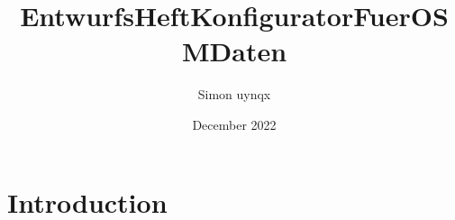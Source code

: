 \documentclass{article}
\title{EntwurfsHeftKonfiguratorFuerOSMDaten}
\author{Simon uynqx}
\date{December 2022}
\begin{document}
\maketitle

\section{Introduction}
\end{document}
